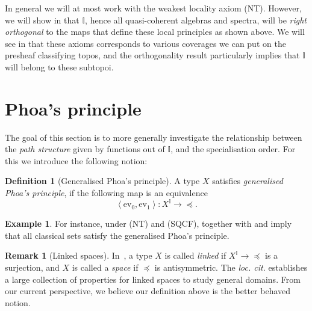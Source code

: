 \documentclass[12pt]{amsart}
\theoremstyle{definition}
\newtheorem{example}[theorem]{Example}
\newtheorem{definition}[theorem]{Definition}
\newtheorem{remark}[theorem]{Remark}
\newcommand{\mbb}[1]{\mathbb{#1}}
\newcommand{\I}{\mbb I}
\newcommand{\pair}[1]{\left\langle#1\right\rangle}
\newcommand{\ev}{\mathrm{ev}}
\begin{document}
In general we will at most work with the weakest locality axiom (NT). However, we will show in  that $\I$, hence all quasi-coherent algebras and spectra, will be \emph{right orthogonal} to the maps that define these local principles as shown above. We will see in  that these axioms corresponds to various coverages we can put on the presheaf classifying topos, and the orthogonality result particularly implies that $\I$ will belong to these subtopoi.



\section{Phoa's principle}\label{sec:intposet}

The goal of this section is to more generally investigate the relationship between the \emph{path structure} given by functions out of $\I$, and the specialisation order. For this we introduce the following notion:

\begin{definition}[Generalised Phoa's principle]\label{def:phoa}
  A type $X$ satisfies \emph{generalised Phoa's principle}, if the following map is an equivalence
  \[ \pair{\ev_0,\ev_1} : X^\I \to \operatorname{\preceq}. \]
\end{definition}

\begin{example}
  For instance, under (NT) and (SQCF),  together with  and  imply that all classical sets satisfy the generalised Phoa's principle.
\end{example}

\begin{remark}[Linked spaces]
  In~\cite{PhoaWesleyKym-Son1991DtiR}, a type $X$ is called \emph{linked} if $X^\I \to \operatorname{\preceq}$ is a surjection, and $X$ is called a \emph{space} if $\preceq$ is antisymmetric. The \emph{loc. cit.} establishes a large collection of properties for linked spaces to study general domains. From our current perspective, we believe our definition above is the better behaved notion.
\end{remark}
\end{document}
